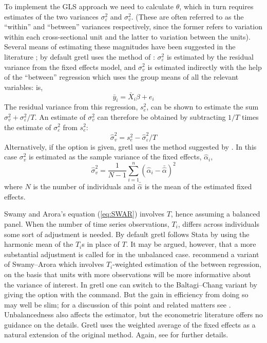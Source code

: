 To implement the GLS approach we need to calculate $\theta$, which in
turn requires estimates of the two variances $\sigma^2_{\varepsilon}$
and $\sigma^2_v$.  (These are often referred to as the ``within'' and
``between'' variances respectively, since the former refers to
variation within each cross-sectional unit and the latter to variation
between the units).  Several means of estimating these magnitudes have
been suggested in the literature \citep[see][]{baltagi95}; by default
gretl uses the method of \cite{swamy72}: $\sigma^2_\varepsilon$ is
estimated by the residual variance from the fixed effects model, and
$\sigma^2_v$ is estimated indirectly with the help of the ``between''
regression which uses the group means of all the relevant variables:
is,
\[
\bar{y}_i = \bar{X}_i \beta + e_i
\]
The residual variance from this regression, $s^2_e$, can be shown to
estimate the sum $\sigma^2_v + \sigma^2_\varepsilon/T$.  An estimate
of $\sigma^2_v$ can therefore be obtained by subtracting $1/T$ times
the estimate of $\sigma^2_\varepsilon$ from $s^2_e$:
\begin{equation}
\label{eq:SWAR}
\hat{\sigma}^2_v = s^2_e - \hat{\sigma}^2_\varepsilon / T
\end{equation}
Alternatively, if the  option is given, gretl
uses the method suggested by \cite{nerlove71}. In this case
$\sigma^2_v$ is estimated as the sample variance of the fixed effects,
$\hat{\alpha}_i$,
\begin{equation}
\label{eq:NLV}
\hat{\sigma}^2_v = \frac{1}{N-1} \sum_{i=1}^n 
  \left(\hat{\alpha}_i - \bar{\hat{\alpha}}\right)^2 
\end{equation}
where $N$ is the number of individuals and $\bar{\hat{\alpha}}$ is the mean
of the estimated fixed effects.

Swamy and Arora's equation (\ref{eq:SWAR}) involves $T$, hence
assuming a balanced panel. When the number of time series
observations, $T_i$, differs across individuals some sort of
adjustment is needed. By default gretl follows \textsf{Stata} by using
the harmonic mean of the $T_i$s in place of $T$. It may be argued,
however, that a more substantial adjustment is called for in the
unbalanced case. \cite{baltagi-chang94} recommend a variant of
Swamy--Arora which involves $T_i$-weighted estimation of the between
regression, on the basis that units with more observations will be
more informative about the variance of interest. In gretl one can
switch to the Baltagi--Chang variant by giving the 
option with the  command. But the gain in efficiency from
doing so may well be slim; for a discussion of this point and related
matters see \cite{cottrell17}.
Unbalancedness also affects the \cite{nerlove71} estimator, but the 
econometric literature offers no guidance on the details. Gretl
uses the weighted average of the fixed effects as a natural extension 
of the original method. Again, see \cite{cottrell17} for further details. 

